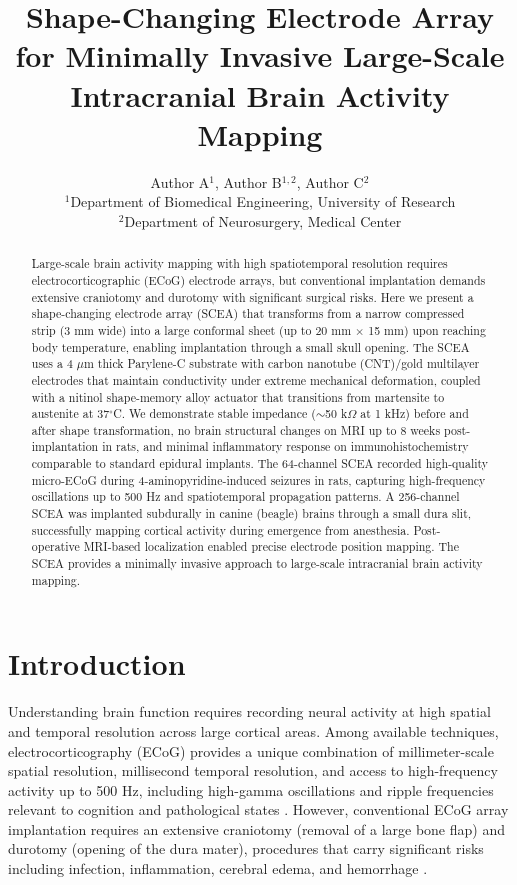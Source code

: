 \documentclass[11pt]{article}
\title{Shape-Changing Electrode Array for Minimally Invasive Large-Scale Intracranial Brain Activity Mapping}
\author{Author A$^{1}$, Author B$^{1,2}$, Author C$^{2}$ \\
\small $^{1}$Department of Biomedical Engineering, University of Research \\
\small $^{2}$Department of Neurosurgery, Medical Center}
\date{}
\begin{document}
\maketitle

\begin{abstract}
Large-scale brain activity mapping with high spatiotemporal resolution requires electrocorticographic (ECoG) electrode arrays, but conventional implantation demands extensive craniotomy and durotomy with significant surgical risks. Here we present a shape-changing electrode array (SCEA) that transforms from a narrow compressed strip (3 mm wide) into a large conformal sheet (up to 20 mm $\times$ 15 mm) upon reaching body temperature, enabling implantation through a small skull opening. The SCEA uses a 4 $\mu$m thick Parylene-C substrate with carbon nanotube (CNT)/gold multilayer electrodes that maintain conductivity under extreme mechanical deformation, coupled with a nitinol shape-memory alloy actuator that transitions from martensite to austenite at 37$^{\circ}$C. We demonstrate stable impedance ($\sim$50 k$\Omega$ at 1 kHz) before and after shape transformation, no brain structural changes on MRI up to 8 weeks post-implantation in rats, and minimal inflammatory response on immunohistochemistry comparable to standard epidural implants. The 64-channel SCEA recorded high-quality micro-ECoG during 4-aminopyridine-induced seizures in rats, capturing high-frequency oscillations up to 500 Hz and spatiotemporal propagation patterns. A 256-channel SCEA was implanted subdurally in canine (beagle) brains through a small dura slit, successfully mapping cortical activity during emergence from anesthesia. Post-operative MRI-based localization enabled precise electrode position mapping. The SCEA provides a minimally invasive approach to large-scale intracranial brain activity mapping.
\end{abstract}

\section{Introduction}

Understanding brain function requires recording neural activity at high spatial and temporal resolution across large cortical areas. Among available techniques, electrocorticography (ECoG) provides a unique combination of millimeter-scale spatial resolution, millisecond temporal resolution, and access to high-frequency activity up to 500 Hz, including high-gamma oscillations and ripple frequencies relevant to cognition and pathological states \citep{muller2016,engel2005}. However, conventional ECoG array implantation requires an extensive craniotomy (removal of a large bone flap) and durotomy (opening of the dura mater), procedures that carry significant risks including infection, inflammation, cerebral edema, and hemorrhage \citep{vanmiert2020,wong2009}.
\end{document}
